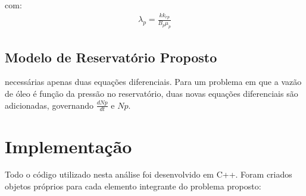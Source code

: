 \documentclass[final,5p]{elsarticle}
\numberwithin{equation}{section}
\begin{document}
        \noindent com:
        \begin{align}
            \lambda_p = \frac{k k_{rp}}{B_p \mu_p} \nonumber
        \end{align}





    \subsection{Modelo de Reservatório Proposto}

        necessárias apenas duas equações diferenciais. Para um problema em que a vazão de óleo é função da pressão no reservatório, duas novas equações diferenciais são adicionadas, governando $\frac{dNp}{dt}$ e $Np$.

\section{Implementação} \label{sec:implementacao}

        Todo o código utilizado nesta análise foi desenvolvido em C++. Foram criados objetos próprios para cada elemento integrante do problema proposto:
\end{document}
